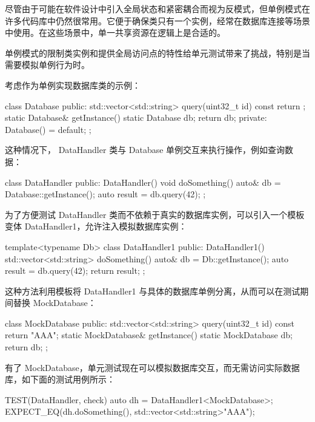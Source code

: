 
尽管由于可能在软件设计中引入全局状态和紧密耦合而视为反模式，但单例模式在许多代码库中仍然很常用。它便于确保类只有一个实例，经常在数据库连接等场景中使用。在这些场景中，单一共享资源在逻辑上是合适的。

单例模式的限制类实例和提供全局访问点的特性给单元测试带来了挑战，特别是当需要模拟单例行为时。

考虑作为单例实现数据库类的示例：

\begin{cpp}
class Database {
public:
    std::vector<std::string> query(uint32_t id) const {
        return {};
    }
    static Database& getInstance() {
        static Database db;
        return db;
    }
private:
    Database() = default;
};
\end{cpp}

这种情况下， DataHandler 类与 Database 单例交互来执行操作，例如查询数据：

\begin{cpp}
class DataHandler {
public:
    DataHandler() {}
    void doSomething() {
        auto& db = Database::getInstance();
        auto result = db.query(42);
    }
};
\end{cpp}

为了方便测试 DataHandler 类而不依赖于真实的数据库实例，可以引入一个模板变体 DataHandler1，允许注入模拟数据库实例：

\begin{cpp}
template<typename Db>
class DataHandler1 {
public:
    DataHandler1() {}
    std::vector<std::string> doSomething() {
        auto& db = Db::getInstance();
        auto result = db.query(42);
        return result;
    }
};
\end{cpp}

这种方法利用模板将 DataHandler1 与具体的数据库单例分离，从而可以在测试期间替换 MockDatabase：

\begin{cpp}
class MockDatabase {
public:
    std::vector<std::string> query(uint32_t id) const {
        return {"AAA"};
    }
    static MockDatabase& getInstance() {
        static MockDatabase db;
        return db;
    }
};
\end{cpp}

有了 MockDatabase，单元测试现在可以模拟数据库交互，而无需访问实际数据库，如下面的测试用例所示：

\begin{cpp}
TEST(DataHandler, check) {
    auto dh = DataHandler1<MockDatabase>{};
    EXPECT_EQ(dh.doSomething(), std::vector<std::string>{"AAA"});
}
\end{cpp}

